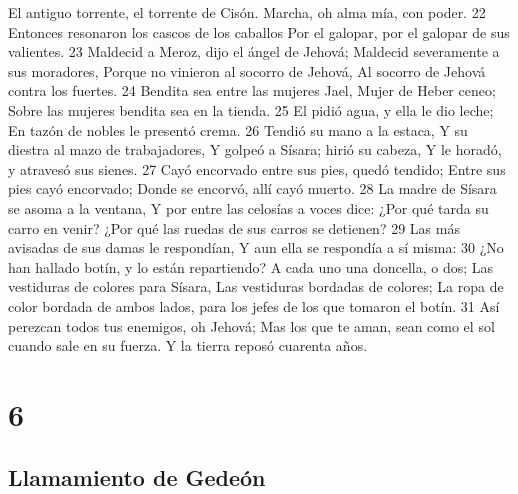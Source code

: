 El antiguo torrente, el torrente de Cisón.
Marcha, oh alma mía, con poder.
22 Entonces resonaron los cascos de los caballos
Por el galopar, por el galopar de sus valientes.
23 Maldecid a Meroz, dijo el ángel de Jehová;
Maldecid severamente a sus moradores,
Porque no vinieron al socorro de Jehová,
Al socorro de Jehová contra los fuertes.
24 Bendita sea entre las mujeres Jael,
Mujer de Heber ceneo;
Sobre las mujeres bendita sea en la tienda.
25 El pidió agua, y ella le dio leche; 
En tazón de nobles le presentó crema.
26 Tendió su mano a la estaca,
Y su diestra al mazo de trabajadores,
Y golpeó a Sísara; hirió su cabeza,
Y le horadó, y atravesó sus sienes. 
27 Cayó encorvado entre sus pies, quedó tendido;
Entre sus pies cayó encorvado;
Donde se encorvó, allí cayó muerto.
28 La madre de Sísara se asoma a la ventana,
Y por entre las celosías a voces dice:
¿Por qué tarda su carro en venir?
¿Por qué las ruedas de sus carros se detienen?
29 Las más avisadas de sus damas le respondían,
Y aun ella se respondía a sí misma:
30 ¿No han hallado botín, y lo están repartiendo?
A cada uno una doncella, o dos;
Las vestiduras de colores para Sísara,
Las vestiduras bordadas de colores;
La ropa de color bordada de ambos lados, para los jefes de los que tomaron el botín.
31 Así perezcan todos tus enemigos, oh Jehová;
Mas los que te aman, sean como el sol cuando sale en su fuerza.
Y la tierra reposó cuarenta años.

\chapter{6}

\section*{Llamamiento de Gedeón}

